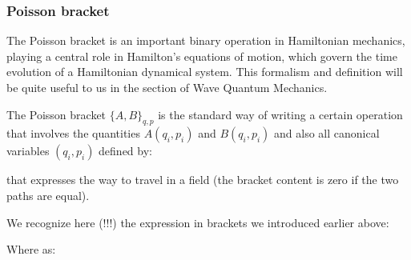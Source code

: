 	\subsubsection{Poisson bracket}
	The Poisson bracket is an important binary operation in Hamiltonian mechanics, playing a central role in Hamilton's equations of motion, which govern the time evolution of a Hamiltonian dynamical system. This formalism and definition will be quite useful to us in the section of Wave Quantum Mechanics.
	
	The Poisson bracket $\{A,B\}_{q,p}$ is the standard way of writing a certain operation that involves the quantities $A(q_i,p_i)$ and $B(q_i,p_i)$ and also all canonical variables $(q_i,p_i)$ defined by:
	
	that expresses the way to travel in a field (the bracket content is zero if the two paths are equal).
	
	We recognize here (!!!) the expression in brackets we introduced earlier above:
	
	Where as:
	

